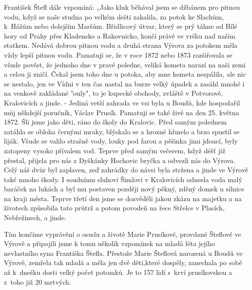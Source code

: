 \documentclass[../dejiny-rodu-prusiku.tex]{subfiles}
\begin{document}
František Štefl dále vzpomíná: „Jako kluk běhával jsem se džbánem pro pitnou vodu, když se naše studna po velkém dešti zakalila, za potok ke Slachům, k Hážům nebo do­lejším Maršům. Břidlicový útvar, který se prý táhne od Bílé hory od Prahy přes Kladensko a Rakovnicko, končí právě ve vršku nad naším statkem. Nedává dobrou pitnou vo­du a druhá strana Výrova za potokem měla vždy lepší pitnou vodu. Pamatuji se, že v roce 1872 nebo 1873 rozšiřovala se všude pověst, že jednoho dne v pravé poledne, veliká kometa narazí na naši zemi a celou ji zničí. Čekal jsem toho dne u potoka, aby mne kometa nespálila, ale nic se nestalo, jen ve Vídni v ten čas nastal na burze velký úpadek a zasáhl mnohé i na venkově zakládané "ouly", to je kupecké obchody, zvláště v Potvorově, Kralovicích a jinde. - Jediná vetší zahrada ve vsi byla u Boudů, kde hospodařil můj někdejší poručník, Václav Prusík. Pamatu­ji se také živě na den 25. května 1872. Šli jsme jako děti, ráno do školy do Kralovic. Před samým polednem zatáhla se obloha černými mraky, blýskalo se a hrozné hřmelo a brzo spustil se liják. Všude se valilo strašně vody, lou­ky pod farou a pěšinka jimi jdoucí, byly zatopeny vyso­ko přívalem vod. Teprve před samým večerem, když déšť již přestal, přijela pro nás z Dyškánky Hochovic bryčka a odvezli nás do Výrova. Celý náš dvůr byl zaplaven, zeď zahrádky do návsi byla stržena a jinde ve Výrově také mnoho škody. I soudnímu sluhovi Šimlovi v Kralovicích od­nesla voda malý baráček na lukách a byl mu postaven později nový pěkný, zděný domek u silnice na kraji města. Teprve třetí den jsme se dozvěděli jakou zkázu na majetku a na životech způsobila tato průtrž a potom povodeň na řece Střelce v Plasích, Nebřežinech, a jinde.

Tím končíme vyprávění o osudu a životě Marie Prusíkové, provdané Šteflové ve Výrově a připojili jsme k tomu několik vzpomínek na mladá léta jejího nevlastního syna Františka Štefla. Přestože Marie Šteflová narozená u Boudů ve Výrově, zemřela tak mladá a měla jen dvě děti,které dospěly, zanechala po sobě až k dnešku dosti velký počet potomků. Je to 157 lidí s krví prusíkovskou a z toho již 20 mrtvých.
\end{document}
